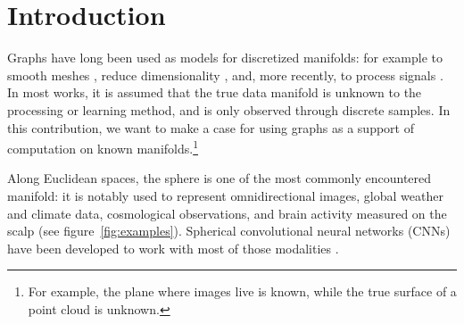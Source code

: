 \documentclass{article} %
\newcommand{\figref}[1]{figure~\ref{fig:#1}}
\newcommand{\1}{\b{1}}              %
\newcommand{\0}{\b{0}}              %
\newcommand{\todo}[1]{{\color[rgb]{.6,.1,.6}{#1}}}
\begin{document}
\section{Introduction}




Graphs have long been used as models for discretized manifolds: for example to smooth meshes \citep{taubin1996meshsmoothing}, reduce dimensionality \citep{belkin2003laplacian}, and, more recently, to process signals \citep{shuman2013gsp}.
In most works, it is assumed that the true data manifold is unknown to the processing or learning method, and is only observed through discrete samples.
In this contribution, we want to make a case for using graphs as a support of computation on known manifolds.\footnote{For example, the plane where images live is known, while the true surface of a point cloud is unknown.}

Along
Euclidean spaces, the sphere is one of the most commonly encountered manifold: it is notably used to represent omnidirectional images, global weather and climate data, cosmological observations, and brain activity measured on the scalp (see \figref{examples}).
Spherical convolutional neural networks (CNNs) have been developed to work with most of those modalities \citep{cohen2018sphericalcnn, esteves2017sphericalcnn, perraudin2018deepsphere, khasanova2017graphomni, boomsma2017sphericalcnn, su2017sphericalcnn, coors2018sphericalcnn,
jiang2019sphericalcnn}.
\end{document}
